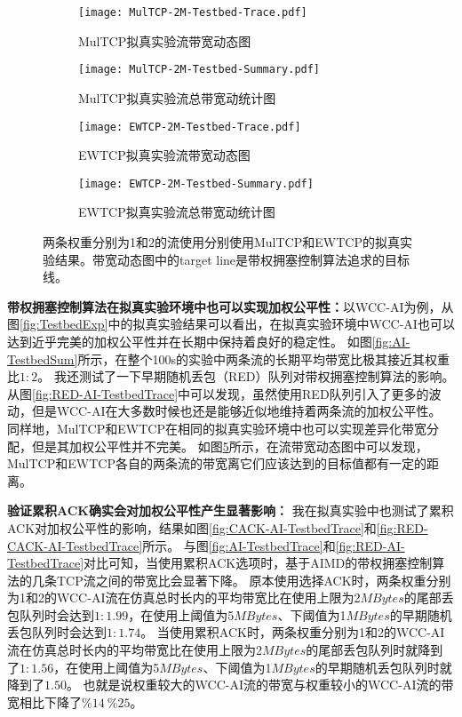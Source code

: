 \documentclass[winfonts]{njuthesis}
\begin{document}
\begin{figure}[h]
  \begin{subfigure}{.5\textwidth}
    \centering
		\texttt{[image: MulTCP-2M-Testbed-Trace.pdf]}
    \caption{MulTCP拟真实验流带宽动态图}
    \label{fig:MulTCP-2M-TestbedTrace}
  \end{subfigure}
	\begin{subfigure}{.5\textwidth}
    \centering
		\texttt{[image: MulTCP-2M-Testbed-Summary.pdf]}
    \caption{MulTCP拟真实验流总带宽动统计图}
    \label{fig:MulTCP-2M-TestbedSum}
  \end{subfigure}
  \begin{subfigure}{.5\textwidth}
    \centering
		\texttt{[image: EWTCP-2M-Testbed-Trace.pdf]}
    \caption{EWTCP拟真实验流带宽动态图}
    \label{fig:EWTCP-2M-TestbedTrace}
  \end{subfigure}
	\begin{subfigure}{.5\textwidth}
    \centering
		\texttt{[image: EWTCP-2M-Testbed-Summary.pdf]}
    \caption{EWTCP拟真实验流总带宽动统计图}
    \label{fig:EWTCP-2M-TestbedSum}
  \end{subfigure}
  \caption{两条权重分别为1和2的流使用分别使用MulTCP和EWTCP的拟真实验结果。带宽动态图中的target line是带权拥塞控制算法追求的目标线。}
  \label{fig:PreWorkTrace}
\end{figure}

\textbf{带权拥塞控制算法在拟真实验环境中也可以实现加权公平性：}以WCC-AI为例，从图\ref{fig:TestbedExp}中的拟真实验结果可以看出，在拟真实验环境中WCC-AI也可以达到近乎完美的加权公平性并在长期中保持着良好的稳定性。
如图\ref{fig:AI-TestbedSum}所示，在整个100s的实验中两条流的长期平均带宽比极其接近其权重比$1:2$。
我还测试了一下早期随机丢包（RED）队列对带权拥塞控制算法的影响。
从图\ref{fig:RED-AI-TestbedTrace}中可以发现，虽然使用RED队列引入了更多的波动，但是WCC-AI在大多数时候也还是能够近似地维持着两条流的加权公平性。
同样地，MulTCP和EWTCP在相同的拟真实验环境中也可以实现差异化带宽分配，但是其加权公平性并不完美。
如图\ref{fig:PreWorkTrace}所示，在流带宽动态图中可以发现，MulTCP和EWTCP各自的两条流的带宽离它们应该达到的目标值都有一定的距离。

\textbf{验证累积ACK确实会对加权公平性产生显著影响：}
我在拟真实验中也测试了累积ACK对加权公平性的影响，结果如图\ref{fig:CACK-AI-TestbedTrace}和\ref{fig:RED-CACK-AI-TestbedTrace}所示。
与图\ref{fig:AI-TestbedTrace}和\ref{fig:RED-AI-TestbedTrace}对比可知，当使用累积ACK选项时，基于AIMD的带权拥塞控制算法的几条TCP流之间的带宽比会显著下降。
原本使用选择ACK时，两条权重分别为1和2的WCC-AI流在仿真总时长内的平均带宽比在使用上限为2$MBytes$的尾部丢包队列时会达到$1:1.99$，在使用上阈值为5$MBytes$、下阈值为1$MBytes$的早期随机丢包队列时会达到$1:1.74$。
当使用累积ACK时，两条权重分别为1和2的WCC-AI流在仿真总时长内的平均带宽比在使用上限为2$MBytes$的尾部丢包队列时就降到了$1:1.56$，在使用上阈值为5$MBytes$、下阈值为1$MBytes$的早期随机丢包队列时就降到了$1.50$。
也就是说权重较大的WCC-AI流的带宽与权重较小的WCC-AI流的带宽相比下降了$\%14~\%25$。
\end{document}
